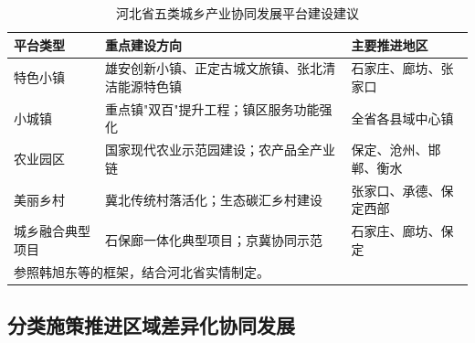 \documentclass[12pt, a4paper, twoside]{ctexart}
\begin{document}
\begin{table}[H]
  \centering
  \caption{河北省五类城乡产业协同发展平台建设建议}
  \label{tab:platform}
  \begin{tabularx}{\linewidth}{l X X}
    \toprule
    \rowcolor{TableHead}
    \color{white}\bfseries 平台类型 &
    \color{white}\bfseries 重点建设方向 &
    \color{white}\bfseries 主要推进地区 \\
    \midrule
    特色小镇 & 雄安创新小镇、正定古城文旅镇、张北清洁能源特色镇 &
      石家庄、廊坊、张家口 \\
    \rowcolor{TableRow}
    小城镇 & 重点镇"双百"提升工程；镇区服务功能强化 &
      全省各县域中心镇 \\
    农业园区 & 国家现代农业示范园建设；农产品全产业链 &
      保定、沧州、邯郸、衡水 \\
    \rowcolor{TableRow}
    美丽乡村 & 冀北传统村落活化；生态碳汇乡村建设 &
      张家口、承德、保定西部 \\
    城乡融合典型项目 & 石保廊一体化典型项目；京冀协同示范 &
      石家庄、廊坊、保定 \\
    \bottomrule
    \multicolumn{3}{l}{\footnotesize 参照韩旭东等\cite{han2025}的框架，结合河北省实情制定。}
  \end{tabularx}
\end{table}

\subsection{分类施策推进区域差异化协同发展}
\end{document}
